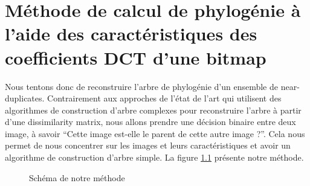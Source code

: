 \documentclass[utf8,final]{stageM2R} %
\begin{document}

\chapter{Méthode de calcul de phylogénie à l'aide des caractéristiques des coefficients DCT d'une bitmap}
\label{chap3}

Nous tentons donc de reconstruire l'arbre de phylogénie d'un ensemble de near-duplicates. Contrairement aux approches de l'état de l'art qui utilisent des algorithmes de construction d'arbre complexes pour reconstruire l'arbre à partir d'une dissimilarity matrix, nous allons prendre une décision binaire entre deux image, à savoir ``Cette image est-elle le parent de cette autre image ?''. Cela nous permet de nous concentrer sur les images et leurs caractéristiques et avoir un algorithme de construction d'arbre simple. La figure \ref{fig:method_schema} présente notre méthode.

\begin{figure}[H]
  \begin{center}
    \caption{Schéma de notre méthode}
    \label{fig:method_schema}
  \end{center}
\end{figure}
\end{document}
